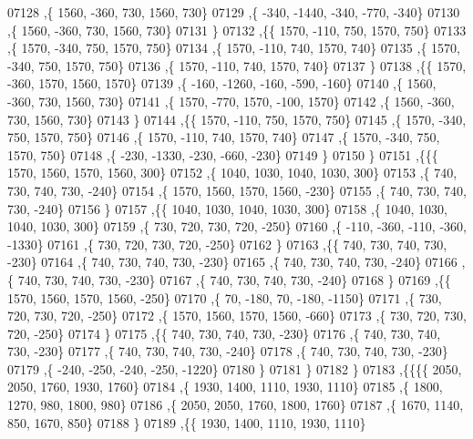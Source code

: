 \begin{DoxyCode}
07128     ,\{  1560,  -360,   730,  1560,   730\}
07129     ,\{  -340, -1440,  -340,  -770,  -340\}
07130     ,\{  1560,  -360,   730,  1560,   730\}
07131     \}
07132    ,\{\{  1570,  -110,   750,  1570,   750\}
07133     ,\{  1570,  -340,   750,  1570,   750\}
07134     ,\{  1570,  -110,   740,  1570,   740\}
07135     ,\{  1570,  -340,   750,  1570,   750\}
07136     ,\{  1570,  -110,   740,  1570,   740\}
07137     \}
07138    ,\{\{  1570,  -360,  1570,  1560,  1570\}
07139     ,\{  -160, -1260,  -160,  -590,  -160\}
07140     ,\{  1560,  -360,   730,  1560,   730\}
07141     ,\{  1570,  -770,  1570,  -100,  1570\}
07142     ,\{  1560,  -360,   730,  1560,   730\}
07143     \}
07144    ,\{\{  1570,  -110,   750,  1570,   750\}
07145     ,\{  1570,  -340,   750,  1570,   750\}
07146     ,\{  1570,  -110,   740,  1570,   740\}
07147     ,\{  1570,  -340,   750,  1570,   750\}
07148     ,\{  -230, -1330,  -230,  -660,  -230\}
07149     \}
07150    \}
07151   ,\{\{\{  1570,  1560,  1570,  1560,   300\}
07152     ,\{  1040,  1030,  1040,  1030,   300\}
07153     ,\{   740,   730,   740,   730,  -240\}
07154     ,\{  1570,  1560,  1570,  1560,  -230\}
07155     ,\{   740,   730,   740,   730,  -240\}
07156     \}
07157    ,\{\{  1040,  1030,  1040,  1030,   300\}
07158     ,\{  1040,  1030,  1040,  1030,   300\}
07159     ,\{   730,   720,   730,   720,  -250\}
07160     ,\{  -110,  -360,  -110,  -360, -1330\}
07161     ,\{   730,   720,   730,   720,  -250\}
07162     \}
07163    ,\{\{   740,   730,   740,   730,  -230\}
07164     ,\{   740,   730,   740,   730,  -230\}
07165     ,\{   740,   730,   740,   730,  -240\}
07166     ,\{   740,   730,   740,   730,  -230\}
07167     ,\{   740,   730,   740,   730,  -240\}
07168     \}
07169    ,\{\{  1570,  1560,  1570,  1560,  -250\}
07170     ,\{    70,  -180,    70,  -180, -1150\}
07171     ,\{   730,   720,   730,   720,  -250\}
07172     ,\{  1570,  1560,  1570,  1560,  -660\}
07173     ,\{   730,   720,   730,   720,  -250\}
07174     \}
07175    ,\{\{   740,   730,   740,   730,  -230\}
07176     ,\{   740,   730,   740,   730,  -230\}
07177     ,\{   740,   730,   740,   730,  -240\}
07178     ,\{   740,   730,   740,   730,  -230\}
07179     ,\{  -240,  -250,  -240,  -250, -1220\}
07180     \}
07181    \}
07182   \}
07183  ,\{\{\{\{  2050,  2050,  1760,  1930,  1760\}
07184     ,\{  1930,  1400,  1110,  1930,  1110\}
07185     ,\{  1800,  1270,   980,  1800,   980\}
07186     ,\{  2050,  2050,  1760,  1800,  1760\}
07187     ,\{  1670,  1140,   850,  1670,   850\}
07188     \}
07189    ,\{\{  1930,  1400,  1110,  1930,  1110\}

\end{DoxyCode}
